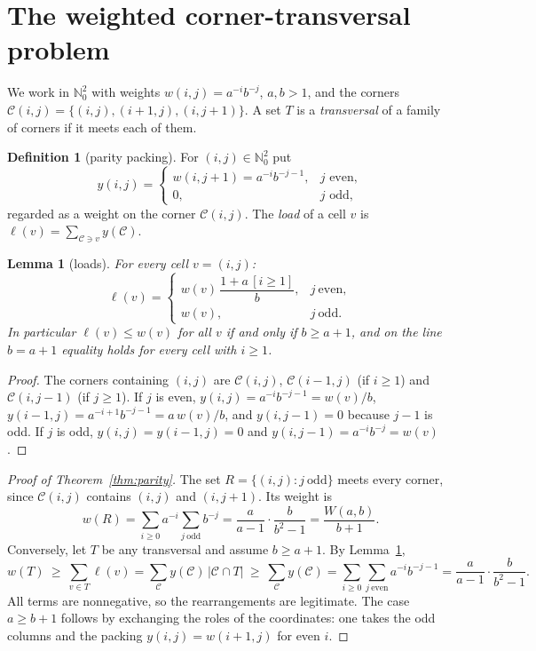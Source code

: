 \documentclass[11pt]{amsart}
\newtheorem{lemma}[theorem]{Lemma}
\theoremstyle{definition}
\newtheorem{definition}[theorem]{Definition}
\newcommand{\N}{\mathbb{N}}
\newcommand{\Cor}{\mathcal{C}}
\begin{document}
\section{The weighted corner-transversal problem}\label{sec:kappa}

We work in $\N_0^2$ with weights $w(i,j)=a^{-i}b^{-j}$, $a,b>1$, and the corners $\Cor(i,j)=\{(i,j),(i+1,j),(i,j+1)\}$. A set $T$ is a \emph{transversal} of a family of corners if it meets each of them.

\begin{definition}[parity packing]\label{def:packing}
For $(i,j)\in\N_0^2$ put
\[
y(i,j)=\begin{cases} w(i,j+1)=a^{-i}b^{-j-1}, & j \text{ even},\\ 0,& j\text{ odd},\end{cases}
\]
regarded as a weight on the corner $\Cor(i,j)$. The \emph{load} of a cell $v$ is $\ell(v)=\sum_{\Cor\ni v}y(\Cor)$.
\end{definition}

\begin{lemma}[loads]\label{lem:loads}
For every cell $v=(i,j)$:
\[
\ell(v)=\begin{cases} w(v)\,\dfrac{1+a\,[i\ge1]}{b}, & j\ \text{even},\\[1ex] w(v), & j\ \text{odd}.\end{cases}
\]
In particular $\ell(v)\le w(v)$ for all $v$ if and only if $b\ge a+1$, and on the line $b=a+1$ equality holds for every cell with $i\ge1$.
\end{lemma}

\begin{proof}
The corners containing $(i,j)$ are $\Cor(i,j)$, $\Cor(i-1,j)$ (if $i\ge1$) and $\Cor(i,j-1)$ (if $j\ge1$). If $j$ is even, $y(i,j)=a^{-i}b^{-j-1}=w(v)/b$, $y(i-1,j)=a^{-i+1}b^{-j-1}=a\,w(v)/b$, and $y(i,j-1)=0$ because $j-1$ is odd. If $j$ is odd, $y(i,j)=y(i-1,j)=0$ and $y(i,j-1)=a^{-i}b^{-j}=w(v)$.
\end{proof}

\begin{proof}[Proof of Theorem~\ref{thm:parity}]
The set $R=\{(i,j): j\ \text{odd}\}$ meets every corner, since $\Cor(i,j)$ contains $(i,j)$ and $(i,j+1)$. Its weight is
\[
w(R)=\sum_{i\ge0}a^{-i}\sum_{j\ \text{odd}}b^{-j}=\frac a{a-1}\cdot\frac{b}{b^2-1}=\frac{W(a,b)}{b+1}.
\]
Conversely, let $T$ be any transversal and assume $b\ge a+1$. By Lemma~\ref{lem:loads},
\[
w(T)\ \ge\ \sum_{v\in T}\ell(v)=\sum_{\Cor}y(\Cor)\,|\Cor\cap T|\ \ge\ \sum_{\Cor}y(\Cor)=\sum_{i\ge0}\sum_{j\ \text{even}}a^{-i}b^{-j-1}=\frac{a}{a-1}\cdot\frac{b}{b^2-1}.
\]
All terms are nonnegative, so the rearrangements are legitimate. The case $a\ge b+1$ follows by exchanging the roles of the coordinates: one takes the odd columns and the packing $y(i,j)=w(i+1,j)$ for even $i$.
\end{proof}
\end{document}
